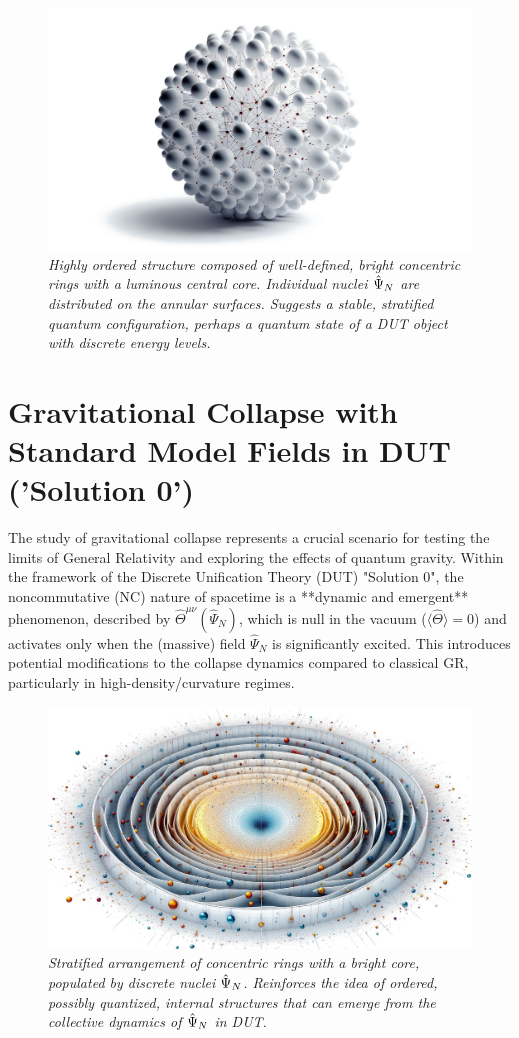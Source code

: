 \documentclass[11pt, a4paper]{article}
\theoremstyle{remark}
\newcommand{\Op}[1]{\hat{#1}}
\begin{document}
\begin{figure}[htbp]
    \centering
    \includegraphics[width=0.6\linewidth]{OIG12.ZNLJ.PNG} %
    \caption{%
      \footnotesize\textit{Highly ordered structure composed of well-defined, bright concentric rings with a luminous central core. Individual nuclei \(\protect\Op{\Psi}_N\) are distributed on the annular surfaces. Suggests a stable, stratified quantum configuration, perhaps a quantum state of a DUT object with discrete energy levels.}
    }
    \label{fig:Figura14}
\end{figure}

\section{Gravitational Collapse with Standard Model Fields in DUT ('Solution 0')}
\label{sec:collapse_TUD_ME}

The study of gravitational collapse represents a crucial scenario for testing the limits of General Relativity and exploring the effects of quantum gravity. Within the framework of the Discrete Unification Theory (DUT) "Solution 0", the noncommutative (NC) nature of spacetime is a **dynamic and emergent** phenomenon, described by \( \Op{\Theta}^{\mu\nu}(\Op{\Psi}_N) \), which is null in the vacuum (\( \langle \Op{\Theta} \rangle = 0 \)) and activates only when the (massive) field \( \Op{\Psi}_N \) is significantly excited. This introduces potential modifications to the collapse dynamics compared to classical GR, particularly in high-density/curvature regimes.

\begin{figure}[htbp]
    \centering
    \includegraphics[width=0.6\linewidth]{OIG26.ZNLJ.PNG}
    \caption{%
      \footnotesize\textit{Stratified arrangement of concentric rings with a bright core, populated by discrete nuclei \(\protect\Op{\Psi}_N\). Reinforces the idea of ordered, possibly quantized, internal structures that can emerge from the collective dynamics of \(\protect\Op{\Psi}_N\) in DUT.}
    }
    \label{fig:Figura16}
\end{figure}
\end{document}

